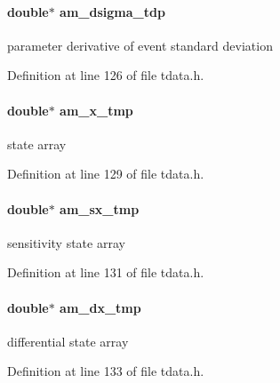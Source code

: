 \paragraph[{am\+\_\+dsigma\+\_\+tdp}]{\setlength{\rightskip}{0pt plus 5cm}double$\ast$ am\+\_\+dsigma\+\_\+tdp}\label{struct_temp_data_a70d1dd9123f113a231825d6d58c92550}
parameter derivative of event standard deviation 

Definition at line 126 of file tdata.\+h.

\hypertarget{struct_temp_data_ab741ac82e5272750a751572dff03daf9}{}
\paragraph[{am\+\_\+x\+\_\+tmp}]{\setlength{\rightskip}{0pt plus 5cm}double$\ast$ am\+\_\+x\+\_\+tmp}\label{struct_temp_data_ab741ac82e5272750a751572dff03daf9}
state array 

Definition at line 129 of file tdata.\+h.

\hypertarget{struct_temp_data_a36291523c0547b6a1086910461d13569}{}
\paragraph[{am\+\_\+sx\+\_\+tmp}]{\setlength{\rightskip}{0pt plus 5cm}double$\ast$ am\+\_\+sx\+\_\+tmp}\label{struct_temp_data_a36291523c0547b6a1086910461d13569}
sensitivity state array 

Definition at line 131 of file tdata.\+h.

\hypertarget{struct_temp_data_a9bf7d112aa52d056192983f55fff2eaf}{}
\paragraph[{am\+\_\+dx\+\_\+tmp}]{\setlength{\rightskip}{0pt plus 5cm}double$\ast$ am\+\_\+dx\+\_\+tmp}\label{struct_temp_data_a9bf7d112aa52d056192983f55fff2eaf}
differential state array 

Definition at line 133 of file tdata.\+h.

\hypertarget{struct_temp_data_a6882e67247f0ba606bea7beb58e06a2a}{}
